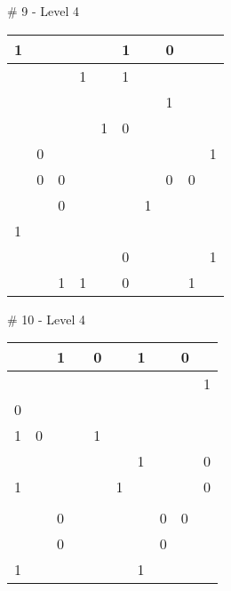 \medskip

\# 9 - Level 4 \newline
\begin{tabular}{|m{\collen}|m{\collen}|m{\collen}|m{\collen}|m{\collen}|m{\collen}|m{\collen}|m{\collen}|m{\collen}|m{\collen}|}
\hline
  1 &   &   &   &   & 1 &   & 0 &   &   \\
\hline
    &   &   & 1 &   & 1 &   &   &   &   \\
\hline
    &   &   &   &   &   &   & 1 &   &   \\
\hline
    &   &   &   & 1 & 0 &   &   &   &   \\
\hline
    & 0 &   &   &   &   &   &   &   & 1 \\
\hline
    & 0 & 0 &   &   &   &   & 0 & 0 &   \\
\hline
    &   & 0 &   &   &   & 1 &   &   &   \\
\hline
  1 &   &   &   &   &   &   &   &   &   \\
\hline
    &   &   &   &   & 0 &   &   &   & 1 \\
\hline
    &   & 1 & 1 &   & 0 &   &   & 1 &   \\
\hline
\end{tabular}


\medskip

\# 10 - Level 4 \newline
\begin{tabular}{|m{\collen}|m{\collen}|m{\collen}|m{\collen}|m{\collen}|m{\collen}|m{\collen}|m{\collen}|m{\collen}|m{\collen}|}
\hline
    &   & 1 &   & 0 &   & 1 &   & 0 &   \\
\hline
    &   &   &   &   &   &   &   &   & 1 \\
\hline
  0 &   &   &   &   &   &   &   &   &   \\
\hline
  1 & 0 &   &   & 1 &   &   &   &   &   \\
\hline
    &   &   &   &   &   & 1 &   &   & 0 \\
\hline
  1 &   &   &   &   & 1 &   &   &   & 0 \\
\hline
    &   &   &   &   &   &   &   &   &   \\
\hline
    &   & 0 &   &   &   &   & 0 & 0 &   \\
\hline
    &   & 0 &   &   &   &   & 0 &   &   \\
\hline
  1 &   &   &   &   &   & 1 &   &   &   \\
\hline
\end{tabular}


\medskip

